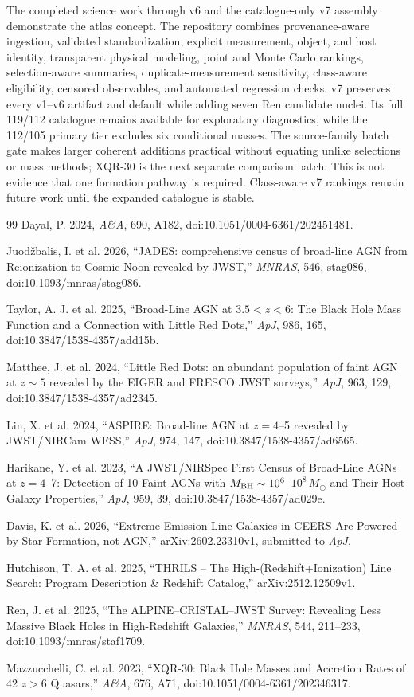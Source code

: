 \documentclass[11pt]{article}
\begin{document}
The completed science work through v6 and the catalogue-only v7 assembly demonstrate the atlas concept. The repository combines provenance-aware ingestion, validated standardization, explicit measurement, object, and host identity, transparent physical modeling, point and Monte Carlo rankings, selection-aware summaries, duplicate-measurement sensitivity, class-aware eligibility, censored observables, and automated regression checks. v7 preserves every v1--v6 artifact and default while adding seven Ren candidate nuclei. Its full 119/112 catalogue remains available for exploratory diagnostics, while the 112/105 primary tier excludes six conditional masses. The source-family batch gate makes larger coherent additions practical without equating unlike selections or mass methods; XQR-30 is the next separate comparison batch. This is not evidence that one formation pathway is required. Class-aware v7 rankings remain future work until the expanded catalogue is stable.

\begin{thebibliography}{99}
Dayal, P. 2024, \emph{A\&A}, 690, A182, doi:10.1051/0004-6361/202451481.

Juod\v{z}balis, I. et al. 2026, ``JADES: comprehensive census of broad-line AGN from Reionization to Cosmic Noon revealed by JWST,'' \emph{MNRAS}, 546, stag086, doi:10.1093/mnras/stag086.

Taylor, A. J. et al. 2025, ``Broad-Line AGN at $3.5<z<6$: The Black Hole Mass Function and a Connection with Little Red Dots,'' \emph{ApJ}, 986, 165, doi:10.3847/1538-4357/add15b.

Matthee, J. et al. 2024, ``Little Red Dots: an abundant population of faint AGN at $z\sim5$ revealed by the EIGER and FRESCO JWST surveys,'' \emph{ApJ}, 963, 129, doi:10.3847/1538-4357/ad2345.

Lin, X. et al. 2024, ``ASPIRE: Broad-line AGN at $z=4$--5 revealed by JWST/NIRCam WFSS,'' \emph{ApJ}, 974, 147, doi:10.3847/1538-4357/ad6565.

Harikane, Y. et al. 2023, ``A JWST/NIRSpec First Census of Broad-Line AGNs at $z=4$--7: Detection of 10 Faint AGNs with $M_{\rm BH}\sim10^6$--$10^8\,M_\odot$ and Their Host Galaxy Properties,'' \emph{ApJ}, 959, 39, doi:10.3847/1538-4357/ad029e.

Davis, K. et al. 2026, ``Extreme Emission Line Galaxies in CEERS Are Powered by Star Formation, not AGN,'' arXiv:2602.23310v1, submitted to \emph{ApJ}.

Hutchison, T. A. et al. 2025, ``THRILS -- The High-(Redshift+Ionization) Line Search: Program Description \& Redshift Catalog,'' arXiv:2512.12509v1.

Ren, J. et al. 2025, ``The ALPINE--CRISTAL--JWST Survey: Revealing Less Massive Black Holes in High-Redshift Galaxies,'' \emph{MNRAS}, 544, 211--233, doi:10.1093/mnras/staf1709.

Mazzucchelli, C. et al. 2023, ``XQR-30: Black Hole Masses and Accretion Rates of 42 $z>6$ Quasars,'' \emph{A\&A}, 676, A71, doi:10.1051/0004-6361/202346317.
\end{thebibliography}
\end{document}
